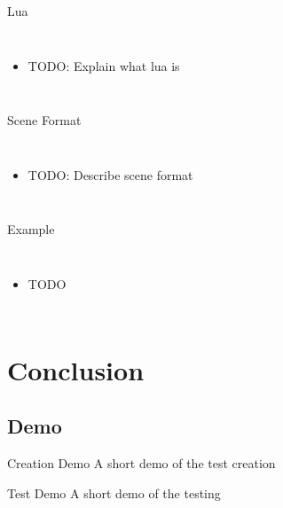 \documentclass[12pt,ucs,hyperref={pdftext}]{beamer}
\newlength{\columnleft}
\newlength{\columnright}
\begin{document}
\begin{frame}{Lua}
\begin{columns}

\column{\columnleft}

\column{\columnright}
\begin{itemize}%
\item TODO: Explain what lua is
\end{itemize}

\end{columns}
\end{frame}

\begin{frame}{Scene Format}
\begin{columns}

\column{\columnleft}

\column{\columnright}
\begin{itemize}%
\item TODO: Describe scene format
\end{itemize}

\end{columns}
\end{frame}

\begin{frame}{Example}
\begin{columns}

\column{\columnleft}

\column{\columnright}
\begin{itemize}%
\item TODO
\end{itemize}

\end{columns}
\end{frame}


\section{Conclusion}

\subsection{Demo}

\begin{frame}{Creation Demo}
A short demo of the test creation
\end{frame}

\begin{frame}{Test Demo}
A short demo of the testing
\end{frame}
\end{document}
